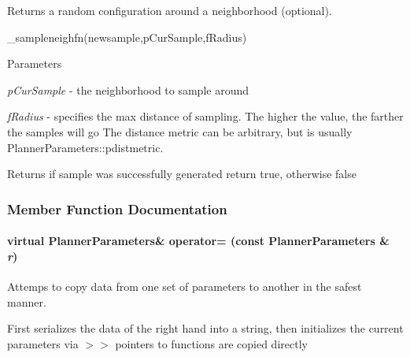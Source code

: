 Returns a random configuration around a neighborhood (optional). 

\_\-sampleneighfn(newsample,pCurSample,fRadius)


\begin{DoxyParams}{Parameters}
\item[{\em pCurSample}]-\/ the neighborhood to sample around \item[{\em fRadius}]-\/ specifies the max distance of sampling. The higher the value, the farther the samples will go The distance metric can be arbitrary, but is usually PlannerParameters::pdistmetric. \end{DoxyParams}
\begin{DoxyReturn}{Returns}
if sample was successfully generated return true, otherwise false 
\end{DoxyReturn}


\subsubsection{Member Function Documentation}
\hypertarget{classOpenRAVE_1_1PlannerBase_1_1PlannerParameters_a98b727075503cffbc2c40ddfd51a8890}{
\paragraph[{operator=}]{\setlength{\rightskip}{0pt plus 5cm}virtual {\bf PlannerParameters}\& operator= (const {\bf PlannerParameters} \& {\em r})}\hfill}
\label{classOpenRAVE_1_1PlannerBase_1_1PlannerParameters_a98b727075503cffbc2c40ddfd51a8890}


Attemps to copy data from one set of parameters to another in the safest manner. 

First serializes the data of the right hand into a string, then initializes the current parameters via $>$$>$ pointers to functions are copied directly 

